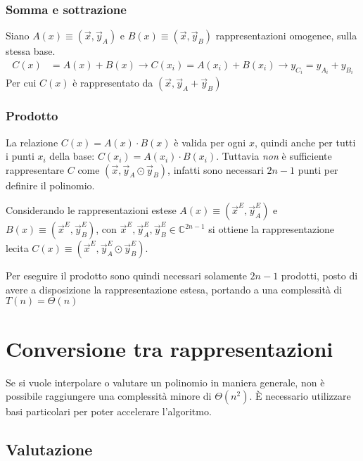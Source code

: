 \subsubsection{Somma e sottrazione}
Siano $A(x) \equiv \left( \vec{x}, \vec{y}_A \right)$ e $B(x) \equiv \left( \vec{x}, \vec{y}_B \right)$ rappresentazioni omogenee, sulla stessa base.
\begin{align*}
    C(x) &= A(x) + B(x)
    \rightarrow C(x_i) = A(x_i)+B(x_i)
    \rightarrow y_{C_{i}}= y_{A_{i}}+ y_{B_{i}}
\end{align*}
Per cui $C(x)$ è rappresentato da $\left( \vec{x}, \vec{y}_A+\vec{y}_B \right)$

\subsubsection{Prodotto}
La relazione $C(x) = A(x) \cdot B(x) $ è valida per ogni $x$, quindi anche per tutti i punti $x_i$ della base: $C(x_i) = A(x_i) \cdot B(x_i) $.
Tuttavia \emph{non} è sufficiente rappresentare $C$ come
$\left( \vec{x}, \vec{y}_A \odot \vec{y}_B \right)$,
infatti sono necessari $2n-1$ punti per definire il polinomio.

Considerando le rappresentazioni estese $A(x) \equiv \left( \vec{x}^E, \vec{y}_A^E \right)$ e $B(x) \equiv \left( \vec{x}^E, \vec{y}_B^E \right)$, con $\vec{x}^E, \vec{y}_A^E,  \vec{y}_B^E \in \mathbb{C}^{2n-1}$ si ottiene la rappresentazione lecita 
$C(x) \equiv \left( \vec{x}^E, \vec{y}^E_A \odot \vec{y}^E_B \right)$.

Per eseguire il prodotto sono quindi necessari solamente $2n-1$ prodotti, posto di avere a disposizione la rappresentazione estesa, portando a una complessità di $T(n) = \Theta \left( n \right)$

\section{Conversione tra rappresentazioni}\label{sez:conversione}
Se si vuole interpolare o valutare un polinomio in maniera generale, non è possibile raggiungere una complessità minore di $\Theta \left( n^2 \right)$. È necessario utilizzare basi particolari per poter accelerare l'algoritmo.

\subsection{Valutazione}

